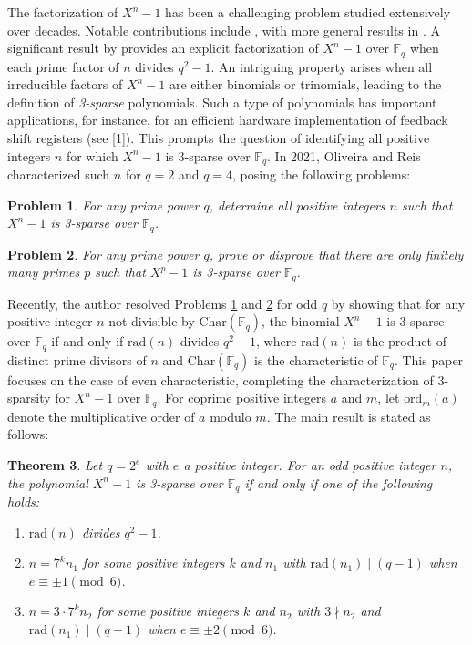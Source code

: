 \documentclass[10pt,reqno]{amsart}
\newtheorem{thm}{Theorem} [section]
\newtheorem{prob}[thm]{Problem}
\theoremstyle{definition}
\theoremstyle{remark}
\numberwithin{equation}{section}
\newcommand{\fq}{{\mathbb F}_{q}}
\begin{document}
The factorization of $X^n - 1$ has been a challenging problem studied extensively over decades. Notable contributions include \cite{[BGM93], [CLT13], [Mey96], [WW12]}, with more general results in \cite{[BRS19], [Gra23]}. A significant result by \cite{[BMOV15]} provides an explicit factorization of $X^n - 1$ over $\mathbb{F}_q$ when each prime factor of $n$ divides $q^2 - 1$. An intriguing property arises when all irreducible factors of $X^n - 1$ are either binomials or trinomials, leading to the definition of \emph{3-sparse} polynomials. Such a type of polynomials has important applications, for instance, for an efficient hardware implementation of feedback shift registers (see [1]). This prompts the question of identifying all positive integers $n$ for which $X^n - 1$ is 3-sparse over $\mathbb{F}_q$. In 2021, Oliveira and Reis \cite{[OR21]} characterized such $n$ for $q = 2$ and $q = 4$, posing the following problems:

\begin{prob}\label{prob1.1}
For any prime power $q$, determine all positive integers $n$ such that $X^n - 1$ is 3-sparse over $\mathbb{F}_q$.
\end{prob}

\begin{prob}\label{prob1.2}
For any prime power $q$, prove or disprove that there are only finitely many primes $p$ such that $X^p - 1$ is 3-sparse over $\mathbb{F}_q$.
\end{prob}

Recently, the author \cite{[C25]} resolved Problems \ref{prob1.1} and \ref{prob1.2} for odd $q$ by showing that for any positive integer $n$ not divisible by $\text{Char}(\fq)$, the binomial $X^n-1$ is $3$-sparse over $\fq$ if and only if $\text{rad}(n)$ divides $q^2-1$, where $\text{rad}(n)$ is the product of distinct prime divisors of $n$ and $\text{Char}(\fq)$ is the characteristic of $\fq$. This paper focuses on the case of even characteristic, completing the characterization of 3-sparsity for $X^n - 1$ over $\mathbb{F}_q$. For coprime positive integers $a$ and $m$, let $\text{ord}_m(a)$ denote the multiplicative order of $a$ modulo $m$. The main result is stated as follows:

\begin{thm}\label{thm1.3}
Let $q = 2^e$ with $e$ a positive integer. For an odd positive integer $n$, the polynomial $X^n - 1$ is 3-sparse over $\mathbb{F}_q$ if and only if one of the following holds:
\begin{enumerate}[label=(\alph*), left=0pt]
    \item $\text{rad}(n)$ divides $q^2-1$.
    \item $n=7^{k}n_1 $ for some positive integers $k$ and $n_1$ with $\text{rad}(n_1)\mid(q-1)$ when $e\equiv \pm1 \pmod{6}$.
    \item $n=3\cdot 7^{k}n_2$ for some positive integers $k$ and $n_2$ with $3\nmid n_2$ and $\text{rad}(n_1)\mid(q-1)$ when $e\equiv \pm2 \pmod{6}$.
\end{enumerate} 
\end{thm}
\end{document}
